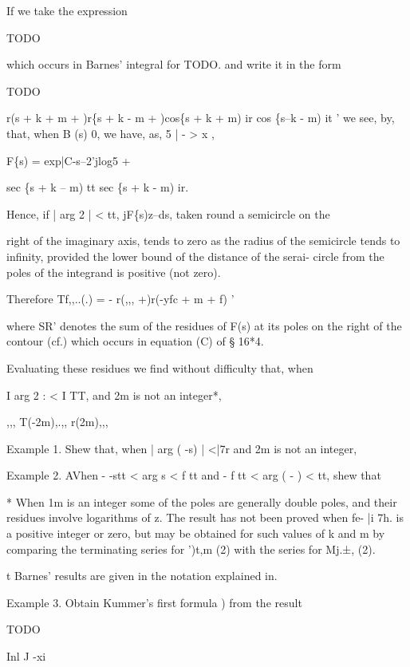 If we take the
expression

TODO

which occurs in Barnes' integral for TODO. and write it in the form

TODO

r(s + k + m + )r\{s + k - m + )cos\{s + k + m) ir cos \{s--k - m)
it ' we see, by, that, when B (s)  0, we have, as, 5 | - > x
,

F\{s) = exp|C-s--2'jlog5 +

sec \{s + k -- m) tt sec \{s + k - m) ir.

Hence, if | arg 2 | <  tt, jF\{s)z--ds, taken round a semicircle
on the

right of the imaginary axis, tends to zero as the radius of the
semicircle tends to infinity, provided the lower bound of the distance
of the serai- circle from the poles of the integrand is positive (not
zero).

Therefore Tf,,..(.) = - r(,,, +)r(-yfc + m + f) '

where SR' denotes the sum of the residues of F(s) at its poles on the
right of the contour (cf.) which occurs in equation (C) of §
16*4.

Evaluating these residues we find without difficulty that, when

I arg 2 : < I TT, and 2m is not an integer*,

,,, T(-2m),.,, r(2m),,,

Example 1. Shew that, when | arg ( -s) | <|7r and 2m is not an
integer,

 Example 2. AVhen - -stt < arg s < f tt and - f tt < arg ( -
) < tt, shew that

* When 1m is an integer some of the poles are generally double poles,
and their residues involve logarithms of z. The result has not been
proved when fe- |i 7h. is a positive integer or zero, but may be
obtained for such values of k and m by comparing the terminating
series for ')t,m (2) with the series for Mj.±, (2).

t Barnes' results are given in the notation explained in.

%
%

Example 3. Obtain Kummer's first formula ) from the result

TODO 

Inl J -xi

